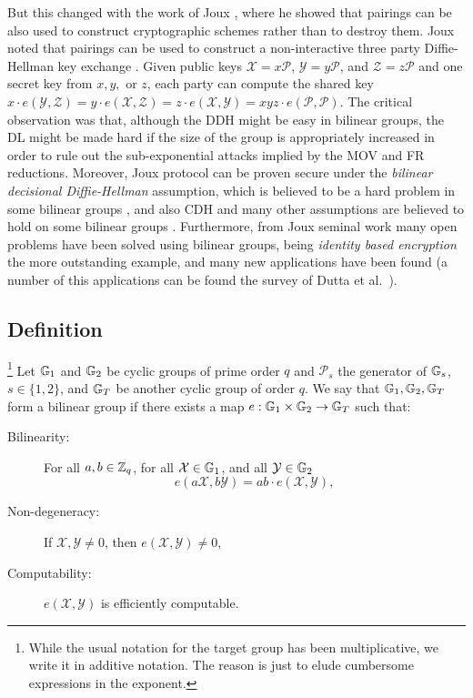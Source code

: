 But this changed with the work of Joux \cite{ANTS:Joux00}, where he showed that pairings can be also used to construct cryptographic schemes rather than to destroy them. Joux noted that pairings can be used to construct a non-interactive three party Diffie-Hellman key exchange \cite{ANTS:Joux00}. Given public keys $\mathcal{X}=x\mathcal{P}$, $\mathcal{Y}=y\mathcal{P}$, and $\mathcal{Z}=z\mathcal{P}$ and one secret key from $x,y,$ or $z$, each party can compute the shared key $x\cdot e(\mathcal{Y},\mathcal{Z})= y\cdot e(\mathcal{X},\mathcal{Z})= z\cdot e(\mathcal{X},\mathcal{Y})=xyz\cdot e(\mathcal{P},\mathcal{P})$. The critical observation was that, although the DDH might be easy in bilinear groups, the DL might be made hard if the size of the group is appropriately increased in order to rule out the sub-exponential attacks implied by the MOV and FR reductions. Moreover, Joux protocol can be proven secure under the \emph{bilinear decisional Diffie-Hellman} assumption, which is believed to be a hard problem in some bilinear groups \cite{C:BonFra01}, and also CDH and many other assumptions are believed to hold on some bilinear groups \cite{ECRYPT:Ver13}. Furthermore, from Joux seminal work many open problems have been solved using bilinear groups, being \emph{identity based encryption} \cite{C:BonFra01} the more outstanding example, and many new applications have been found (a number of this applications can be found the survey of Dutta et al.~\cite{EPRINT:DutBarSar04a}). 

\subsection{Definition}

\begin{definition} \footnote{While the usual notation for the target group has been multiplicative, we write it in additive notation. The reason is just to elude cumbersome expressions in the exponent.}
Let $\mathbb{G}_1$ and $\mathbb{G}_2$ be cyclic groups of prime order $q$ and $\mathcal{P}_s$ the generator of $\mathbb{G}_s$, $s\in\{1,2\}$, and $\mathbb{G}_T$ be another cyclic group of order $q$. We say that $\mathbb{G}_1,\mathbb{G}_2,\mathbb{G}_T$ form a bilinear group if there exists a map $e:\mathbb{G}_1\times\mathbb{G}_2\to\mathbb{G}_T$ such that:
\begin{description}
\item[Bilinearity:] For all $a,b\in\mathbb{Z}_q$, for all $\mathcal{X}\in\mathbb{G}_1$, and all $\mathcal{Y}\in\mathbb{G}_2$
$$
e(a\mathcal{X},b\mathcal{Y})=ab\cdot e(\mathcal{X},\mathcal{Y}),
$$
\item[Non-degeneracy:] If $\mathcal{X},\mathcal{Y}\neq0$, then $e(\mathcal{X},\mathcal{Y})\neq 0$,
\item[Computability:] $e(\mathcal{X},\mathcal{Y})$ is efficiently computable.
\end{description} 
\end{definition} 

